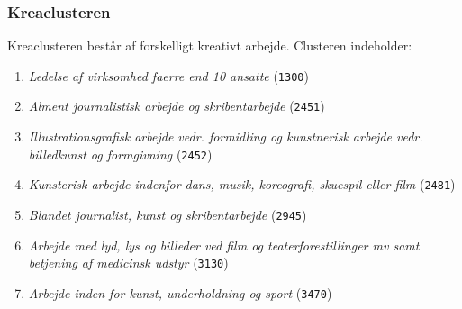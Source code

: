 \subsubsection{Kreaclusteren \label{}}
% 
Kreaclusteren består af forskelligt kreativt arbejde. Clusteren indeholder:
 \begin{enumerate} [topsep=6pt,itemsep=-1ex]
   \item \emph{Ledelse af virksomhed faerre end 10 ansatte} (\texttt{1300})
   \item \emph{Alment journalistisk arbejde og skribentarbejde} (\texttt{2451}) 
   \item \emph{Illustrationsgrafisk arbejde vedr. formidling og kunstnerisk arbejde vedr. billedkunst og formgivning} (\texttt{2452}) 
   \item \emph{Kunsterisk arbejde indenfor dans, musik, koreografi, skuespil eller film} (\texttt{2481}) 
   \item \emph{Blandet journalist, kunst og skribentarbejde} (\texttt{2945}) 
   \item \emph{Arbejde med lyd, lys og billeder ved film og teaterforestillinger mv samt betjening af medicinsk udstyr} (\texttt{3130}) 
   \item \emph{Arbejde inden for kunst, underholdning og sport} (\texttt{3470})
 \end{enumerate}
% 













